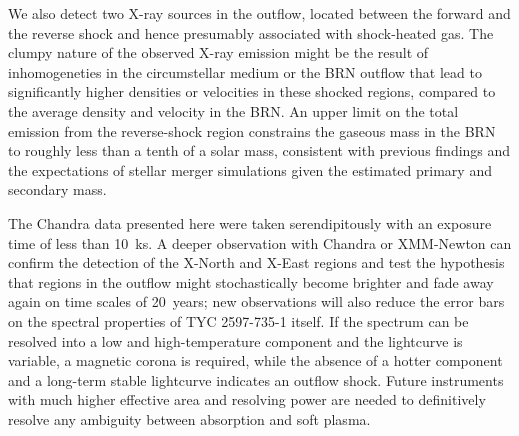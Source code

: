 \documentclass[linenumbers]{aastex631}
\begin{document}
We also detect two X-ray sources in the outflow, located between the forward and the reverse shock and hence presumably associated with shock-heated gas. The clumpy nature of the observed X-ray emission might be the result of inhomogeneties in the circumstellar medium or the BRN outflow that lead to significantly higher densities or velocities in these shocked regions, compared to the average density and velocity in the BRN. An upper limit on the total emission from the reverse-shock region constrains the gaseous mass in the BRN to roughly less than a tenth of a solar mass, consistent with previous findings \citep{2020Natur.587..387H} and the expectations of stellar merger simulations given the estimated primary and secondary mass.

The Chandra data presented here were taken serendipitously with an exposure time of less than 10~ks. A deeper observation with Chandra or XMM-Newton can confirm the detection of the X-North and X-East regions and test the hypothesis that regions in the outflow might stochastically become brighter and fade away again on time scales of 20~years; new observations will also reduce the error bars on the spectral properties of TYC 2597-735-1 itself. If the spectrum can be resolved into a low and high-temperature component and the lightcurve is variable, a magnetic corona is required, while the absence of a hotter component and a long-term stable lightcurve indicates an outflow shock. Future instruments with much higher effective area and resolving power are needed to definitively resolve any ambiguity between absorption and soft plasma.
\end{document}
